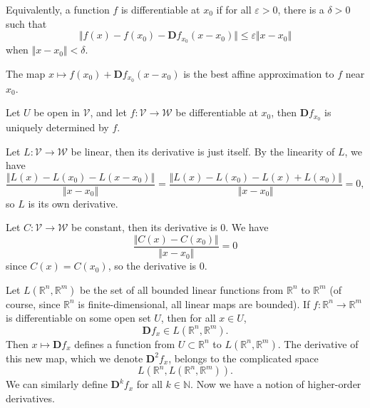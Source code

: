 \documentclass[10pt]{report}
\begin{document}
Equivalently, a function $f$ is differentiable at $x_0$ if for all $\varepsilon>0$, there is a $\delta>0$ such that
\[
	\Vert{f(x)-f(x_0)-\mathbf{D}f_{x_0}(x-x_0)}\Vert \leq \varepsilon\Vert{x-x_0}\Vert
\] when $\Vert{x-x_0}\Vert<\delta$.

\begin{note}[]
	The map $x \mapsto f(x_0) + \mathbf{D}f_{x_0}(x-x_0)$ is the best affine approximation to $f$ near $x_0$.
\end{note}

\begin{thrm}[]
Let $U$ be open in $\mathcal{V}$, and let $f:\mathcal{V} \to \mathcal{W}$ be differentiable at $x_0$, then $\mathbf{D}f_{x_0}$ is uniquely determined by $f$.
\end{thrm}

\begin{ex}
Let $L: \mathcal{V} \to \mathcal{W}$ be linear, then its derivative is just itself. By the linearity of $L$, we have
\[
	\frac{\Vert{L(x)-L(x_0)-L(x-x_0)}\Vert}{\Vert{x-x_0}\Vert} = \frac{\Vert{L(x)-L(x_0)-L(x)+L(x_0)}\Vert}{\Vert{x-x_0}\Vert} = 0,
\] so $L$ is its own derivative.
\end{ex}

\begin{ex}
Let $C:\mathcal{V}\to\mathcal{W}$ be constant, then its derivative is 0. We have
\[
	\frac{\Vert{C(x)-C(x_0)}\Vert}{\Vert{x-x_0}\Vert} = 0
\] since $C(x)=C(x_0)$, so the derivative is 0.
\end{ex}

Let $L(\mathbb{R}^n, \mathbb{R}^m)$ be the set of all bounded linear functions from $\mathbb{R}^n$ to $\mathbb{R}^m$ (of course, since $\mathbb{R}^n$ is finite-dimensional, all linear maps are bounded). If $f:\mathbb{R}^n \to \mathbb{R}^m$ is differentiable on some open set $U$, then for all $x \in U$,
\[
	\mathbf{D}f_x \in L(\mathbb{R}^n, \mathbb{R}^m).
\] Then $x \mapsto \mathbf{D}f_x$ defines a function from $U \subset \mathbb{R}^n$ to $L(\mathbb{R}^n, \mathbb{R}^m)$. The derivative of this new map, which we denote $\mathbf{D}^2f_x$, belongs to the complicated space
\[
	L(\mathbb{R}^n, L(\mathbb{R}^n, \mathbb{R}^m)).
\] We can similarly define $\mathbf{D}^k f_x$ for all $k \in \mathbb{N}$. Now we have a notion of higher-order derivatives.
\end{document}
